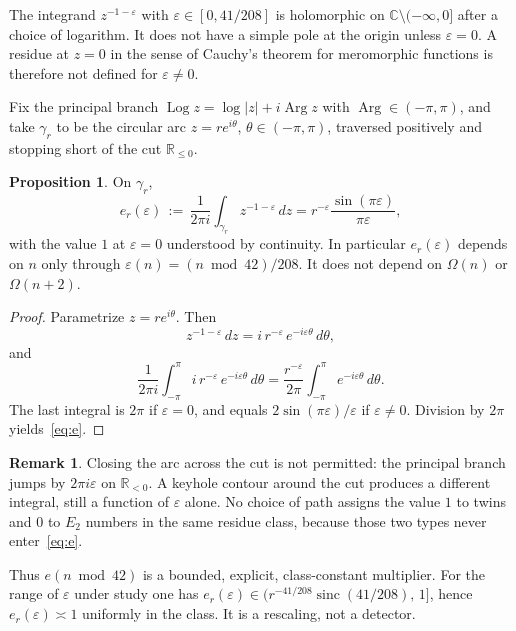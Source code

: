 \documentclass[11pt,a4paper]{article}
\theoremstyle{plain}
\theoremstyle{definition}
\newtheorem{remark}{Remark}
\newtheorem{proposition}{Proposition}
\theoremstyle{plain}
\numberwithin{equation}{section}
\begin{document}
The integrand \(z^{-1-\varepsilon}\) with \(\varepsilon\in[0,41/208]\) is holomorphic on \(\mathbb{C}\setminus(-\infty,0]\) after a choice of logarithm. It does not have a simple pole at the origin unless \(\varepsilon=0\). A residue at \(z=0\) in the sense of Cauchy's theorem for meromorphic functions is therefore not defined for \(\varepsilon\neq 0\).

Fix the principal branch \(\operatorname{Log} z=\log|z|+i\operatorname{Arg} z\) with \(\operatorname{Arg}\in(-\pi,\pi)\), and take \(\gamma_r\) to be the circular arc \(z=re^{i\theta}\), \(\theta\in(-\pi,\pi)\), traversed positively and stopping short of the cut \(\mathbb{R}_{\le 0}\).

\begin{proposition}
\label{prop:e}
On \(\gamma_r\),
\begin{equation}
\label{eq:e}
e_r(\varepsilon)\,:=\,\frac{1}{2\pi i}\int_{\gamma_r}z^{-1-\varepsilon}\,dz
=r^{-\varepsilon}\frac{\sin(\pi\varepsilon)}{\pi\varepsilon},
\end{equation}
with the value \(1\) at \(\varepsilon=0\) understood by continuity. In particular \(e_r(\varepsilon)\) depends on \(n\) only through \(\varepsilon(n)=(n\bmod 42)/208\). It does not depend on \(\Omega(n)\) or \(\Omega(n+2)\).
\end{proposition}

\begin{proof}
Parametrize \(z=re^{i\theta}\). Then
\[
z^{-1-\varepsilon}\,dz=i\,r^{-\varepsilon}\,e^{-i\varepsilon\theta}\,d\theta,
\]
and
\[
\frac{1}{2\pi i}\int_{-\pi}^{\pi}i\,r^{-\varepsilon}\,e^{-i\varepsilon\theta}\,d\theta
=\frac{r^{-\varepsilon}}{2\pi}\int_{-\pi}^{\pi}e^{-i\varepsilon\theta}\,d\theta.
\]
The last integral is \(2\pi\) if \(\varepsilon=0\), and equals \(2\sin(\pi\varepsilon)/\varepsilon\) if \(\varepsilon\neq 0\). Division by \(2\pi\) yields~\eqref{eq:e}.
\end{proof}

\begin{remark}
Closing the arc across the cut is not permitted: the principal branch jumps by \(2\pi i\varepsilon\) on \(\mathbb{R}_{<0}\). A keyhole contour around the cut produces a different integral, still a function of \(\varepsilon\) alone. No choice of path assigns the value \(1\) to twins and \(0\) to \(E_2\) numbers in the same residue class, because those two types never enter~\eqref{eq:e}.
\end{remark}

Thus \(e(n\bmod 42)\) is a bounded, explicit, class-constant multiplier. For the range of \(\varepsilon\) under study one has \(e_r(\varepsilon)\in\bigl(r^{-41/208}\operatorname{sinc}(41/208),\,1\bigr]\), hence \(e_r(\varepsilon)\asymp 1\) uniformly in the class. It is a rescaling, not a detector.
\end{document}
